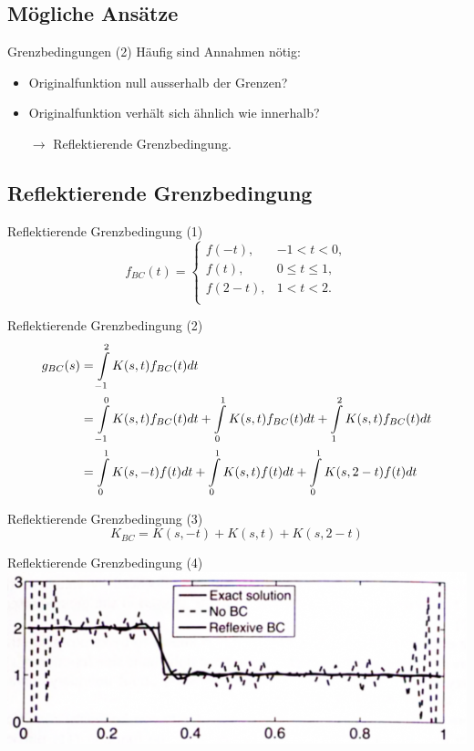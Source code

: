 \documentclass[11pt]{beamer}
\begin{document}
\subsection{Mögliche Ansätze}
\begin{frame}{Grenzbedingungen (2)}
Häufig sind Annahmen nötig:
\begin{itemize}
\item Originalfunktion null ausserhalb der Grenzen?
\item Originalfunktion verhält sich ähnlich wie innerhalb?

$\rightarrow$ Reflektierende Grenzbedingung.
\end{itemize}
\end{frame}


\subsection{Reflektierende Grenzbedingung}
\begin{frame}{Reflektierende Grenzbedingung (1)}
\[
f_{BC}(t) = \begin{cases}
f(-t), & -1 < t < 0,\\
f(t),  & 0 \leq t \leq 1,\\
f(2-t),& 1 < t < 2.\\
\end{cases}
\]
\end{frame}


\begin{frame}{Reflektierende Grenzbedingung (2)}
\begin{align}
g_{BC}(s) & = \int\limits_{-1}^2 K(s,  t) f_{BC}(t) dt \notag \\
          & = \int\limits_{-1}^0 K(s,  t) f_{BC}(t) dt
            + \int\limits_{ 0}^1 K(s,  t) f_{BC}(t) dt
            + \int\limits_{ 1}^2 K(s,  t) f_{BC}(t) dt \notag \\
          & = \int\limits_{ 0}^1 K(s, -t) f     (t) dt
            + \int\limits_{ 0}^1 K(s,  t) f     (t) dt
            + \int\limits_{0 }^1 K(s,2-t) f     (t) dt \notag
\end{align}
\end{frame}


\begin{frame}{Reflektierende Grenzbedingung (3)}
 \[K_{BC} = K(s, -t) + K(s,  t) + K(s, 2-t)\]
\end{frame}


\begin{frame}{Reflektierende Grenzbedingung (4)}
\includegraphics[scale=0.38]{boundary_conditions} 
\end{frame}
\end{document}
